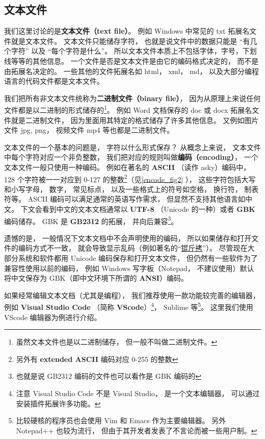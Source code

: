 
\subsection{文本文件}
我们这里讨论的是\textbf{文本文件（text file）}。 例如 Windows 中常见的 txt 拓展名文件就是文本文件。 文本文件只能储存字符， 也就是说文件中的数据只能是 “有几个字符” 以及 “每个字符是什么”。 所以文本文件本质上不包括字体，字号，下划线等等的其他信息。 一个文件是否是文本文件是由它的编码格式决定的， 而不是由拓展名决定的。 一些其他的文件拓展名如 html， xml， md， 以及大部分编程语言的代码文件都是文本文件。

我们把所有非文本文件统称为\textbf{二进制文件（binary file）}， 因为从原理上来说任何文件都是以二进制的形式储存的\footnote{虽然文本文件也是以二进制储存， 但一般不叫做二进制文件。}。 例如 Word 文档保存的 doc 或 docx 拓展名文件就是二进制文件， 因为里面用其特定的格式储存了许多其他信息。  又例如图片文件 jpg, png， 视频文件 mp4 等也都是二进制文件。

文本文件的一个基本的问题是， 字符以什么形式保存？ 从概念上来说， 文本文件中每个字符对应一个非负整数， 我们把对应的规则叫做\textbf{编码（encoding）}， 一个文本文件一般只使用一种编码。 例如在著名的 \textbf{ASCII} （读作 asky）编码中， 128 个字符被一一对应到 0-127 的整数\footnote{另外有 \textbf{extended ASCII} 编码对应 0-255 的整数}（见\autoref{encode_fig2} ）， 这些字符包括大写和小写字母， 数字， 常见标点， 以及一些格式上的符号如空格， 换行符， 制表符等。 ASCII 编码可以满足通常的英语写作需求， 但显然不支持其他语言如中文。 下文会看到中文的文本文档通常以 \textbf{UTF-8} （Unicode 的一种）或者 \textbf{GBK} 编码储存。 GBK 是 \textbf{GB2312} 的拓展， 并向后兼容\footnote{也就是说 GB2312 编码的文件也可以看作是 GBK 编码的}。

遗憾的是， 一般情况下文本文档中不会声明使用的编码， 所以如果储存和打开文件的编码方式不一致， 就会导致显示乱码（例如著名的“\href{https://baike.baidu.com/item/锟斤拷}{锟斤拷}”）。 尽管现在大部分系统和软件都用 Unicode 编码保存和打开文本文件， 但仍然有一些软件为了兼容性使用以前的编码， 例如 Windows 写字板（Notepad， 不建议使用）默认将中文保存为 GBK（即中文环境下所谓的 \textbf{ANSI}）编码。

如果经常编辑文本文档（尤其是编程）， 我们推荐使用一款功能较完善的编辑器， 例如 \textbf{Visual Studio Code} （简称 \textbf{VScode}）\footnote{注意 Visual Studio Code 不是 Visual Studio， 是一个文本编辑器， 可以通过安装插件拓展许多功能。}， Sublime 等\footnote{比较硬核的程序员也会使用 Vim 和 Emacs 作为主要编辑器。 另外 Notepad++ 也较为流行， 但由于其开发者发表了不言论而被一些用户制。}。 这里我们使用 VScode 编辑器为例进行介绍。

